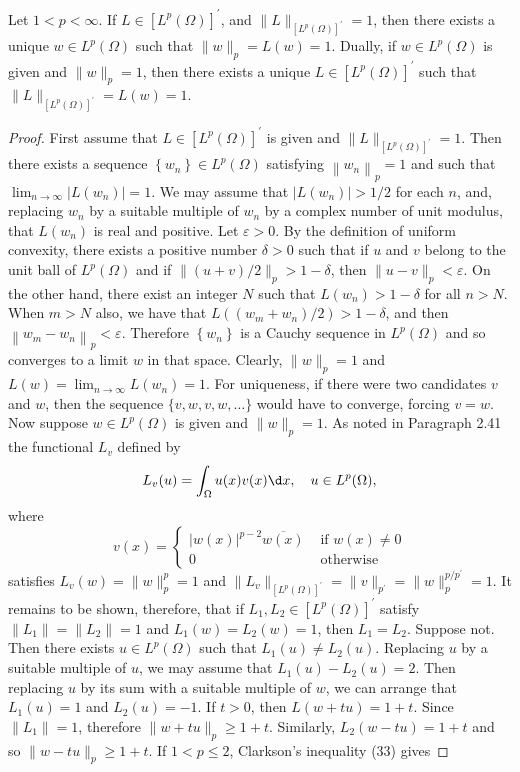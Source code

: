 \begin{lemma}
  Let $1<p<\infty$. If $L \in\left[L^p(\Omega)\right]^{\prime}$, and $\|L\|_{\left[L^p(\Omega)\right]^{\prime}}=1$, then there exists a unique $w \in L^p(\Omega)$ such that $\|w\|_p=L(w)=1$. Dually, if $w \in L^p(\Omega)$ is given and $\|w\|_p=1$, then there exists a unique $L \in\left[L^p(\Omega)\right]^{\prime}$ such that $\|L\|_{\left[L^p(\Omega)\right]^{\prime}}=L(w)=1$.
\end{lemma}

\begin{proof}
  First assume that $L \in\left[L^p(\Omega)\right]^{\prime}$ is given and $\|L\|_{\left[L^p(\Omega)\right]^{\prime}}=1$. Then there exists a sequence $\left\{w_n\right\} \in L^p(\Omega)$ satisfying $\left\|w_n\right\|_p=1$ and such that $\lim _{n \rightarrow \infty}\left|L\left(w_n\right)\right|=1$. We may assume that $\left|L\left(w_n\right)\right|>1 / 2$ for each $n$, and, replacing $w_n$ by a suitable multiple of $w_n$ by a complex number of unit modulus, that $L\left(w_n\right)$ is real and positive. Let $\varepsilon>0$. By the definition of uniform convexity, there exists a positive number $\delta>0$ such that if $u$ and $v$ belong to the unit ball of $L^p(\Omega)$ and if $\|(u+v) / 2\|_p>1-\delta$, then $\|u-v\|_p<\varepsilon$. On the other hand, there exist an integer $N$ such that $L\left(w_n\right)>1-\delta$ for all $n>N$. When $m>N$ also, we have that $L\left(\left(w_m+w_n\right) / 2\right)>1-\delta$, and then $\left\|w_m-w_n\right\|_p<\varepsilon$. Therefore $\left\{w_n\right\}$ is a Cauchy sequence in $L^p(\Omega)$ and so converges to a limit $w$ in that space. Clearly, $\|w\|_p=1$ and $L(w)=\lim _{n \rightarrow \infty} L\left(w_n\right)=1$. For uniqueness, if there were two candidates $v$ and $w$, then the sequence $\{v, w, v, w, \ldots\}$ would have to converge, forcing $v=w$.
  Now suppose $w \in L^p(\Omega)$ is given and $\|w\|_p=1$. As noted in Paragraph 2.41 the functional $L_v$ defined by
  \begin{equation}\label{eq:2.35}
    L_v(u)=\int_{\Omega} u(x) v(x) \d x, \quad u \in L^p(\Omega),
  \end{equation}
  where
  \begin{equation}\label{eq:2.36}
    v(x)= \begin{cases}|w(x)|^{p-2} \overline{w(x)} & \text { if } w(x) \neq 0 \\ 0 & \text { otherwise }\end{cases}
  \end{equation}
  satisfies $L_v(w)=\|w\|_p^p=1$ and $\|L_v\|_{\left[L^p(\Omega)\right]^{\prime}}=\|v\|_{p^{\prime}}=\|w\|_p^{p / p^{\prime}}=1$. It remains to be shown, therefore, that if $L_1, L_2 \in\left[L^p(\Omega)\right]^{\prime}$ satisfy $\left\|L_1\right\|=\left\|L_2\right\|=1$ and $L_1(w)=L_2(w)=1$, then $L_1=L_2$. Suppose not. Then there exists $u \in L^p(\Omega)$ such that $L_1(u) \neq L_2(u)$. Replacing $u$ by a suitable multiple of $u$, we may assume that $L_1(u)-L_2(u)=2$. Then replacing $u$ by its sum with a suitable multiple of $w$, we can arrange that $L_1(u)=1$ and $L_2(u)=-1$. If $t>0$, then $L(w+t u)=1+t$. Since $\left\|L_1\right\|=1$, therefore $\|w+t u\|_p \geq 1+t$. Similarly, $L_2(w-t u)=1+t$ and so $\|w-t u\|_p \geq 1+t$. If $1<p \leq 2$, Clarkson's inequality (33) gives

\end{proof}
